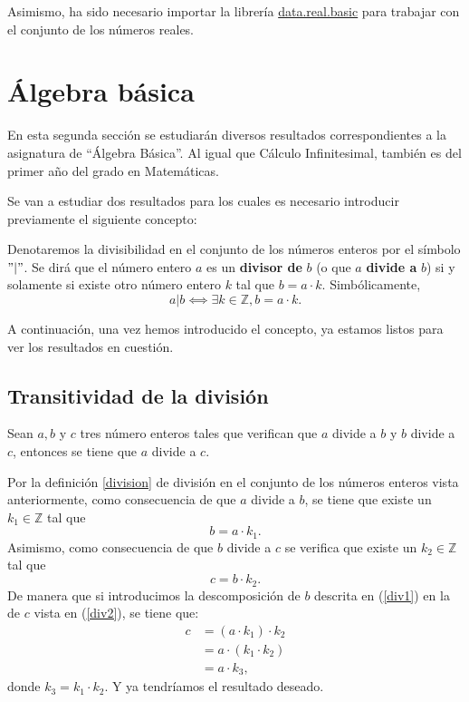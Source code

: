 Asimismo, ha sido necesario importar la librería
\href{https://github.com/leanprover-community/mathlib/blob/master/src/data/real/basic.lean}{data.real.basic}
para trabajar con el conjunto de los números reales.

\section{Álgebra básica}

En esta segunda sección se estudiarán diversos resultados
correspondientes a la asignatura de ``Álgebra Básica''.  Al igual que
Cálculo Infinitesimal, también es del primer año del grado en
Matemáticas.

Se van a estudiar dos resultados para los cuales es necesario introducir
previamente el siguiente concepto:
\begin{definicion}\label{division}
  Denotaremos la divisibilidad en el conjunto de los números enteros por
  el símbolo \("|"\). Se dirá que el número entero \(a\) es un
  \textbf{divisor de} \(b\) (o que \(a\) \textbf{divide a} \(b\)) si y
  solamente si existe otro número entero \(k\) tal que \(b = a · k\).
  Simbólicamente,
  \begin{equation}
    a|b ⟺ ∃ k ∈ ℤ, b = a · k.
  \end{equation}
\end{definicion}

A continuación, una vez hemos introducido el concepto, ya estamos listos
para ver los resultados en cuestión.

\subsection{Transitividad de la división}

\begin{teorema}
  Sean \(a, b\) y \(c\) tres número enteros tales que verifican que
  \(a\) divide a \(b\) y \(b\) divide a \(c\), entonces se tiene que
  \(a\) divide a \(c\).
\end{teorema}

\begin{demostracion}
  Por la definición \ref{division} de división en el conjunto de los
  números enteros vista anteriormente, como consecuencia de que \(a\)
  divide a \(b\), se tiene que existe un \(k_1 ∈ ℤ\) tal que
  \begin{equation}\label{div1}
    b = a · k_1.
  \end{equation}
  Asimismo, como consecuencia de que \(b\) divide a \(c\) se verifica
  que existe un \(k_2 ∈ ℤ\) tal que
  \begin{equation}\label{div2}
    c = b · k_2.
  \end{equation}
  De manera que si introducimos la descomposición de \(b\) descrita en
  (\ref{div1}) en la de \(c\) vista en (\ref{div2}), se tiene que:
  \[\begin{array}{ll}
      c & = (a · k_1) · k_2\\
        & = a · (k_1 · k_2) \\
        & = a · k_3,
    \end{array}\]
  donde \(k_3 = k_1 · k_2\). Y ya tendríamos el resultado deseado.
\end{demostracion}

